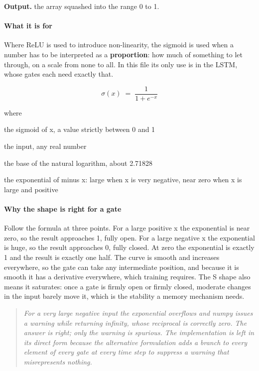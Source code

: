 \noindent\textbf{Output.} the array squashed into the range 0 to 1.


\paragraph{What it is for}
Where ReLU is used to introduce non-linearity, the sigmoid is used when a number has to be interpreted as a \textbf{proportion}: how much of something to let through, on a scale from none to all. In this file its only use is in the LSTM, whose gates each need exactly that.


\begin{equation}
\sigma(x) \;=\; \frac{1}{1 + e^{-x}}
\end{equation}

\noindent where
\begin{description}[leftmargin=2.4em,style=nextline,font=\normalfont\ttfamily]\setlength\itemsep{1pt}
  \item[{$\sigma(x)$}] \normalfont the sigmoid of x, a value strictly between 0 and 1
  \item[{$x$}] \normalfont the input, any real number
  \item[{$e$}] \normalfont the base of the natural logarithm, about 2.71828
  \item[{$e^{-x}$}] \normalfont the exponential of minus x: large when x is very negative, near zero when x is large and positive
\end{description}

\paragraph{Why the shape is right for a gate}
Follow the formula at three points. For a large positive x the exponential is near zero, so the result approaches 1, fully open. For a large negative x the exponential is huge, so the result approaches 0, fully closed. At zero the exponential is exactly 1 and the result is exactly one half. The curve is smooth and increases everywhere, so the gate can take any intermediate position, and because it is smooth it has a derivative everywhere, which training requires. The S shape also means it saturates: once a gate is firmly open or firmly closed, moderate changes in the input barely move it, which is the stability a memory mechanism needs.


\begin{quote}\small\itshape For a very large negative input the exponential overflows and numpy issues a warning while returning infinity, whose reciprocal is correctly zero. The answer is right; only the warning is spurious. The implementation is left in its direct form because the alternative formulation adds a branch to every element of every gate at every time step to suppress a warning that misrepresents nothing.\end{quote}

